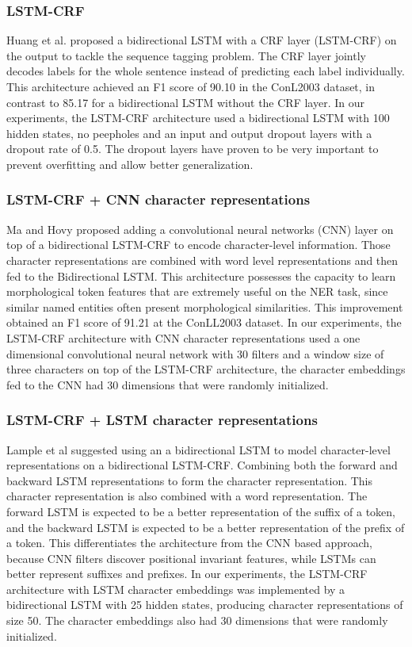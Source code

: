 \documentclass[sigconf]{acmart}
\begin{document}
\subsubsection{LSTM-CRF}

Huang et al. \cite{Huang2015} proposed a bidirectional LSTM with a CRF layer (LSTM-CRF) on the output to tackle
the sequence tagging problem. The CRF layer jointly decodes labels for the whole sentence instead
of predicting each label individually. This architecture achieved an F1 score of 90.10 in the 
ConL2003 dataset, in contrast to 85.17 for a bidirectional LSTM without the CRF layer. 
In our experiments, the LSTM-CRF architecture used a bidirectional LSTM with 100 
hidden states, no peepholes and an input and output dropout layers with a dropout
rate of 0.5. The dropout layers have proven to be very important to prevent overfitting 
and allow better generalization.

\subsubsection{LSTM-CRF + CNN character representations}

Ma and Hovy \cite{Ma2016} proposed adding a convolutional neural networks (CNN) layer 
on top of a bidirectional LSTM-CRF to encode character-level information. Those character
representations are combined with word level representations and then fed to the
Bidirectional LSTM. This architecture possesses the capacity to learn morphological
token features that are extremely useful on the NER task, since similar named entities 
often present morphological similarities. This improvement obtained an F1 score of 
91.21 at the ConLL2003 dataset. In our experiments, the LSTM-CRF architecture with
CNN character representations used a one dimensional convolutional neural network with 30 
filters and a window size of three characters on top of the LSTM-CRF architecture,
the character embeddings fed to the CNN had 30 dimensions that were randomly initialized.

\subsubsection{LSTM-CRF + LSTM character representations}

Lample et al \cite{Lample2016} suggested using an a bidirectional LSTM to model character-level 
representations on a bidirectional LSTM-CRF. Combining both the forward and backward 
LSTM representations to form the character representation. This character
representation is also combined with a word representation. The forward LSTM is expected to be a better
representation of the suffix of a token, and the backward LSTM is expected to be a
better representation of the prefix of a token. This differentiates the architecture
from the CNN based approach, because CNN filters discover positional invariant
features, while LSTMs can better represent suffixes and prefixes. In our experiments, 
the LSTM-CRF architecture with LSTM character embeddings was implemented by a bidirectional LSTM
with 25 hidden states, producing character representations of size 50. The character embeddings
also had 30 dimensions that were randomly initialized.
\end{document}
